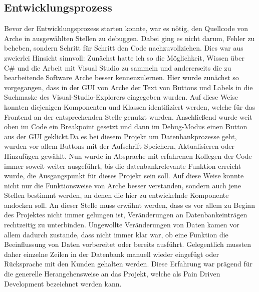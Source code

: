 \documentclass[11pt,toc=sectionentrywithoutdots, 
headheight=44pt, headings=optiontoheadandtoc, hyperfootnotes=false, hypertexnames=false]{scrartcl}
\begin{document}
\subsection{Entwicklungsprozess}
Bevor der Entwicklungsprozess starten konnte, war es nötig, den Quellcode von Arche in ausgewählten Stellen zu debuggen. Dabei ging es nicht darum, Fehler zu beheben, sondern Schritt für Schritt den Code nachzuvollziehen. Dies war aus zweierlei Hinsicht sinnvoll: Zunächst hatte ich so die Möglichkeit, Wissen über C\# und die Arbeit mit Visual Studio zu sammeln und andererseits die zu bearbeitende Software Arche besser kennenzulernen. Hier wurde zunächst so vorgegangen, dass in der GUI von Arche der Text von Buttons und Labels in die Suchmaske des Visual-Studio-Explorers eingegeben wurden. Auf diese Weise konnten diejenigen Komponenten und Klassen identifiziert werden, welche für das Frontend an der entsprechenden Stelle genutzt wurden. Anschließend wurde weit oben im Code ein \gls{Breakpoint} gesetzt und dann im Debug-Modus einen Button aus der GUI geklickt.\newline\newline Da es bei diesem Projekt um Datenbankprozesse geht, wurden vor allem Buttons mit der Aufschrift \glqq Speichern\grqq{}, \glqq Aktualisieren\grqq{} oder \glqq Hinzufügen\grqq{} gewählt. Nun wurde in Absprache mit erfahrenen Kollegen der Code immer soweit weiter ausgeführt, bis die datenbankrelevante Funktion erreicht wurde, die Ausgangspunkt für dieses Projekt sein soll. Auf diese Weise konnte nicht nur die Funktionsweise von Arche besser verstanden, sondern auch jene Stellen bestimmt werden, an denen die hier zu entwickelnde Komponente andocken soll. An dieser Stelle muss erwähnt werden, dass es vor allem zu Beginn des Projektes nicht immer gelungen ist, Veränderungen an Datenbankeinträgen rechtzeitig zu unterbinden. Ungewollte Veränderungen von Daten kamen vor allem dadurch zustande, dass nicht immer klar war, ob eine Funktion die Beeinflussung von Daten vorbereitet oder bereits ausführt. Gelegentlich mussten daher einzelne Zeilen in der Datenbank manuell wieder eingefügt oder Rücksprache mit den Kunden gehalten werden. Diese Erfahrung war prägend für die generelle Herangehensweise an das Projekt, welche als \gls{Pain Driven Development} bezeichnet werden kann.
\end{document}
